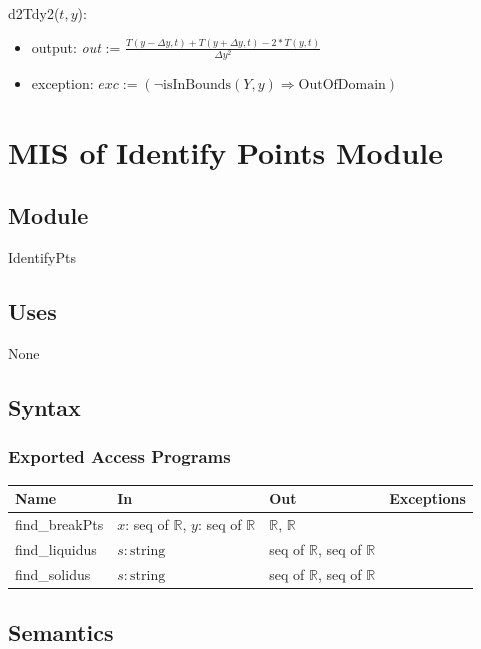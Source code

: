\documentclass[12pt, titlepage]{article}
\begin{document}
\noindent d2Tdy2($t, y$):
\begin{itemize}
\item output: \textit{out} := $\frac{T(y - \Delta y, t) + T(y + \Delta y, t) - 2 * T(y,
    t)}{\Delta y^2}$
\item exception: $exc := (\neg \mbox{isInBounds}(Y, y) \Rightarrow \mbox{OutOfDomain})$
\end{itemize}

\newpage

\section{MIS of Identify Points Module} \label{bkpt}

\subsection{Module}

IdentifyPts

\subsection{Uses}

None

\subsection{Syntax}

\subsubsection{Exported Access Programs}

\begin{center}
\begin{tabular}{p{3cm} p{2cm} p{4cm} p{2cm}}
\hline
\textbf{Name} & \textbf{In} & \textbf{Out} & \textbf{Exceptions} \\
\hline
find\_breakPts & $x$: seq of $\mathbb{R}$, $y$: seq of $\mathbb{R}$ & $\mathbb{R}$, $\mathbb{R}$ & \\
find\_liquidus & $s: \mbox{string}$ & seq of $\mathbb{R}$, seq of $\mathbb{R}$ & \\
find\_solidus & $s: \mbox{string}$ & seq of $\mathbb{R}$, seq of $\mathbb{R}$ & \\
\hline
\end{tabular}
\end{center}

\subsection{Semantics}
\end{document}
